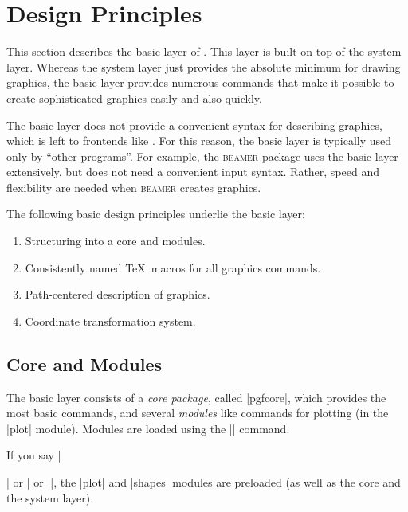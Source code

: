 %
%
%


\section{Design Principles}

This section describes the basic layer of \pgfname. This layer is built on top
of the system layer. Whereas the system layer just provides the absolute
minimum for drawing graphics, the basic layer provides numerous commands that
make it possible to create sophisticated graphics easily and also quickly.

The basic layer does not provide a convenient syntax for describing graphics,
which is left to frontends like \tikzname. For this reason, the basic layer is
typically used only by ``other programs''. For example, the \textsc{beamer}
package uses the basic layer extensively, but does not need a convenient input
syntax. Rather, speed and flexibility are needed when \textsc{beamer} creates
graphics.

The following basic design principles underlie the basic layer:
%
\begin{enumerate}
    \item Structuring into a core and modules.
    \item Consistently named \TeX\ macros for all graphics commands.
    \item Path-centered description of graphics.
    \item Coordinate transformation system.
\end{enumerate}


\subsection{Core and Modules}

The basic layer consists of a \emph{core package}, called |pgfcore|, which
provides the most basic commands, and several \emph{modules} like commands for
plotting (in the |plot| module). Modules are loaded using the |\usepgfmodule|
command.

If you say |\usepackage{pgf}| or | or |\usemodule[pgf]|, the
|plot| and |shapes| modules are preloaded (as well as the core and the system
layer).


